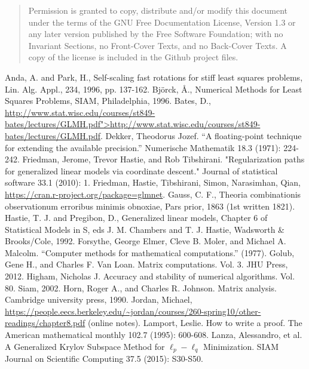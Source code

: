 \documentclass[10pt]{article} %
\begin{document}
\begin{quote}
    Permission is granted to copy, distribute and/or modify this document
    under the terms of the GNU Free Documentation License, Version 1.3
    or any later version published by the Free Software Foundation;
    with no Invariant Sections, no Front-Cover Texts, and no Back-Cover Texts.
    A copy of the license is included in the Github project files.
\end{quote}



\begin{thebibliography}{99}
 Anda, A. and Park, H., Self-scaling fast rotations for stiff least squares problems, Lin. Alg. Appl., 234, 1996, pp. 137-162.
 Bj\"orck, \AA.,  Numerical Methods for Least Squares Problems, SIAM, Philadelphia, 1996.
 Bates, D., \url{http://www.stat.wisc.edu/courses/st849-bates/lectures/GLMH.pdf">http://www.stat.wisc.edu/courses/st849-bates/lectures/GLMH.pdf}.
Dekker, Theodorus Jozef. ``A floating-point technique for extending the available precision.'' Numerische Mathematik 18.3 (1971): 224-242.
 Friedman, Jerome, Trevor Hastie, and Rob Tibshirani. "Regularization paths for generalized linear models via coordinate descent." Journal of statistical software 33.1 (2010): 1.
 Friedman, Hastie, Tibshirani, Simon, Narasimhan, Qian, \url{https://cran.r-project.org/package=glmnet}.
 Gauss, C. F., Theoria combinationis observationum erroribus minimis obnoxiae, Pars prior, 1863 (1st written 1821).
 Hastie, T. J. and Pregibon, D., Generalized linear models, Chapter 6 of Statistical Models in S, eds J. M. Chambers and T.  J. Hastie, Wadsworth \& Brooks/Cole, 1992.
 Forsythe, George Elmer, Cleve B. Moler, and Michael A. Malcolm. ``Computer methods for mathematical computations.'' (1977).
 Golub, Gene H., and Charles F. Van Loan. Matrix computations. Vol. 3. JHU Press, 2012.
 Higham, Nicholas J. Accuracy and stability of numerical algorithms. Vol. 80. Siam, 2002.
 Horn, Roger A., and Charles R. Johnson. Matrix analysis. Cambridge university press, 1990.
 Jordan, Michael, \url{https://people.eecs.berkeley.edu/~jordan/courses/260-spring10/other-readings/chapter8.pdf} (online notes).
 Lamport, Leslie. How to write a proof. The American mathematical monthly 102.7 (1995): 600-608.
Lanza, Alessandro, et al. A Generalized Krylov Subspace Method for $\ell_p-\ell_q$ Minimization. SIAM Journal on Scientific Computing 37.5 (2015): S30-S50.

\end{thebibliography}
\end{document}
